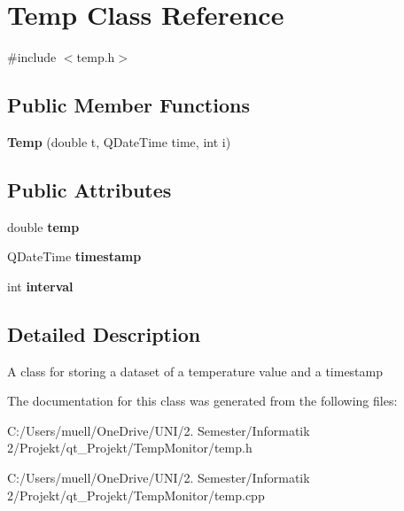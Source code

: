 \hypertarget{class_temp}{}\section{Temp Class Reference}
\label{class_temp}


{\ttfamily \#include $<$temp.\+h$>$}

\subsection*{Public Member Functions}
\begin{DoxyCompactItemize}
\item 
{\bfseries Temp} (double t, Q\+Date\+Time time, int i)\hypertarget{class_temp_ac0cb3f11a2a9c9b4175d2867ba50e499}{}\label{class_temp_ac0cb3f11a2a9c9b4175d2867ba50e499}

\end{DoxyCompactItemize}
\subsection*{Public Attributes}
\begin{DoxyCompactItemize}
\item 
double {\bfseries temp}\hypertarget{class_temp_a599fd6c9646291de791fde0b8b2553e6}{}\label{class_temp_a599fd6c9646291de791fde0b8b2553e6}

\item 
Q\+Date\+Time {\bfseries timestamp}\hypertarget{class_temp_af7e6ec5c6aac775b855491ff26531de3}{}\label{class_temp_af7e6ec5c6aac775b855491ff26531de3}

\item 
int {\bfseries interval}\hypertarget{class_temp_a01725bdf952fc8aeb9e3ec4238ef4e8c}{}\label{class_temp_a01725bdf952fc8aeb9e3ec4238ef4e8c}

\end{DoxyCompactItemize}


\subsection{Detailed Description}
A class for storing a dataset of a temperature value and a timestamp 

The documentation for this class was generated from the following files\+:\begin{DoxyCompactItemize}
\item 
C\+:/\+Users/muell/\+One\+Drive/\+U\+N\+I/2. Semester/\+Informatik 2/\+Projekt/qt\+\_\+\+Projekt/\+Temp\+Monitor/temp.\+h\item 
C\+:/\+Users/muell/\+One\+Drive/\+U\+N\+I/2. Semester/\+Informatik 2/\+Projekt/qt\+\_\+\+Projekt/\+Temp\+Monitor/temp.\+cpp\end{DoxyCompactItemize}

